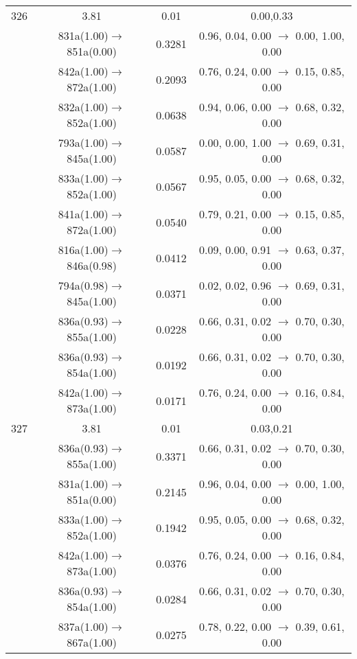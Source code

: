 \documentclass[10pt,a4paper]{article}
\begin{document}
\begin{longtable}{c|c|c|c}
 \hline326 &	 3.81 &	 0.01 &	 0.00,0.33 \\ 
  	& 831a(1.00)$\rightarrow$851a(0.00) &	 0.3281 &	 0.96, 0.04, 0.00 $\rightarrow$ 0.00, 1.00, 0.00 \\ 
 	& 842a(1.00)$\rightarrow$872a(1.00) &	 0.2093 &	 0.76, 0.24, 0.00 $\rightarrow$ 0.15, 0.85, 0.00 \\ 
 	& 832a(1.00)$\rightarrow$852a(1.00) &	 0.0638 &	 0.94, 0.06, 0.00 $\rightarrow$ 0.68, 0.32, 0.00 \\ 
 	& 793a(1.00)$\rightarrow$845a(1.00) &	 0.0587 &	 0.00, 0.00, 1.00 $\rightarrow$ 0.69, 0.31, 0.00 \\ 
 	& 833a(1.00)$\rightarrow$852a(1.00) &	 0.0567 &	 0.95, 0.05, 0.00 $\rightarrow$ 0.68, 0.32, 0.00 \\ 
 	& 841a(1.00)$\rightarrow$872a(1.00) &	 0.0540 &	 0.79, 0.21, 0.00 $\rightarrow$ 0.15, 0.85, 0.00 \\ 
 	& 816a(1.00)$\rightarrow$846a(0.98) &	 0.0412 &	 0.09, 0.00, 0.91 $\rightarrow$ 0.63, 0.37, 0.00 \\ 
 	& 794a(0.98)$\rightarrow$845a(1.00) &	 0.0371 &	 0.02, 0.02, 0.96 $\rightarrow$ 0.69, 0.31, 0.00 \\ 
 	& 836a(0.93)$\rightarrow$855a(1.00) &	 0.0228 &	 0.66, 0.31, 0.02 $\rightarrow$ 0.70, 0.30, 0.00 \\ 
 	& 836a(0.93)$\rightarrow$854a(1.00) &	 0.0192 &	 0.66, 0.31, 0.02 $\rightarrow$ 0.70, 0.30, 0.00 \\ 
 	& 842a(1.00)$\rightarrow$873a(1.00) &	 0.0171 &	 0.76, 0.24, 0.00 $\rightarrow$ 0.16, 0.84, 0.00 \\ 
 \hline327 &	 3.81 &	 0.01 &	 0.03,0.21 \\ 
  	& 836a(0.93)$\rightarrow$855a(1.00) &	 0.3371 &	 0.66, 0.31, 0.02 $\rightarrow$ 0.70, 0.30, 0.00 \\ 
 	& 831a(1.00)$\rightarrow$851a(0.00) &	 0.2145 &	 0.96, 0.04, 0.00 $\rightarrow$ 0.00, 1.00, 0.00 \\ 
 	& 833a(1.00)$\rightarrow$852a(1.00) &	 0.1942 &	 0.95, 0.05, 0.00 $\rightarrow$ 0.68, 0.32, 0.00 \\ 
 	& 842a(1.00)$\rightarrow$873a(1.00) &	 0.0376 &	 0.76, 0.24, 0.00 $\rightarrow$ 0.16, 0.84, 0.00 \\ 
 	& 836a(0.93)$\rightarrow$854a(1.00) &	 0.0284 &	 0.66, 0.31, 0.02 $\rightarrow$ 0.70, 0.30, 0.00 \\ 
 	& 837a(1.00)$\rightarrow$867a(1.00) &	 0.0275 &	 0.78, 0.22, 0.00 $\rightarrow$ 0.39, 0.61, 0.00 \\ 

\end{longtable}
\end{document}
